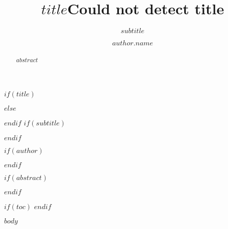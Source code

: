 \documentclass[acmsmall,nonacm]{acmart}
\begin{document}
$if(title)$
\title{$title$}
$else$
\title{Could not detect title}
$endif$
$if(subtitle)$
\subtitle{$subtitle$}
$endif$

$if(author)$
\author{$author.name$}
$endif$


$if(abstract)$
\begin{abstract}
$abstract$
\end{abstract}
$endif$

\maketitle

\renewcommand{\shortauthors}{$author.name$}

$if(toc)$
\setcounter{tocdepth}{$toc-depth$}
\tableofcontents
\pagebreak
$endif$


$body$



\end{document}
